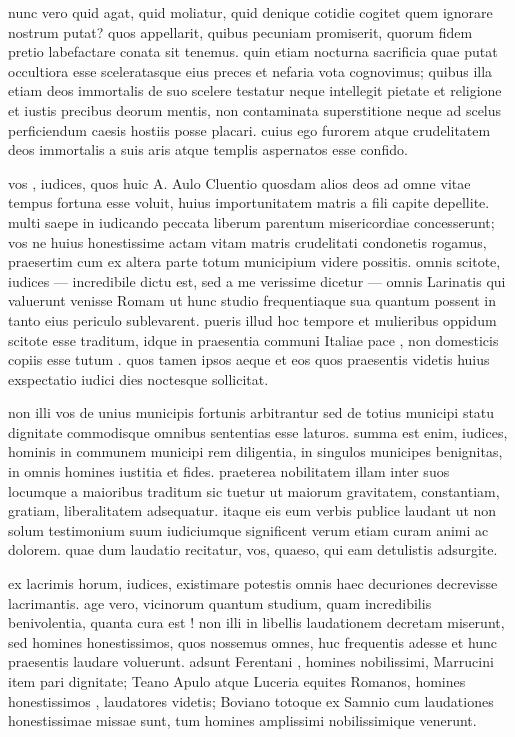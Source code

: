  nunc vero quid agat, quid moliatur, quid denique cotidie cogitet quem ignorare nostrum putat? quos appellarit, quibus pecuniam promiserit, quorum fidem pretio labefactare conata sit tenemus. quin etiam nocturna sacrificia quae putat occultiora esse sceleratasque eius preces et nefaria vota cognovimus; quibus illa etiam deos immortalis de suo scelere testatur neque intellegit pietate et religione et iustis precibus deorum mentis, non contaminata superstitione neque ad scelus perficiendum caesis hostiis posse placari. cuius ego furorem atque crudelitatem deos immortalis a suis aris atque templis aspernatos esse confido.

 vos , iudices, quos huic A. Aulo Cluentio quosdam alios deos ad omne vitae tempus fortuna esse voluit, huius importunitatem matris a fili capite depellite. multi saepe in iudicando peccata liberum parentum misericordiae concesserunt; vos ne huius honestissime actam vitam matris crudelitati condonetis rogamus, praesertim cum ex altera parte totum municipium videre possitis. omnis scitote, iudices — incredibile dictu est, sed a me verissime dicetur — omnis Larinatis qui valuerunt venisse Romam ut hunc studio frequentiaque sua quantum possent in tanto eius periculo sublevarent. pueris illud hoc tempore et mulieribus oppidum scitote esse traditum, idque in praesentia communi Italiae pace , non domesticis copiis esse tutum . quos tamen ipsos aeque et eos quos praesentis videtis huius exspectatio iudici dies noctesque sollicitat.

 non illi vos de unius municipis fortunis arbitrantur sed de totius municipi statu dignitate commodisque omnibus sententias esse laturos. summa est enim, iudices, hominis in communem municipi rem diligentia, in singulos municipes benignitas, in omnis homines iustitia et fides. praeterea nobilitatem illam inter suos locumque a maioribus traditum sic tuetur ut maiorum gravitatem, constantiam, gratiam, liberalitatem adsequatur. itaque eis eum verbis publice laudant ut non solum testimonium suum iudiciumque significent verum etiam curam animi ac dolorem. quae dum laudatio recitatur, vos, quaeso, qui eam detulistis adsurgite.

 ex lacrimis horum, iudices, existimare potestis omnis haec decuriones decrevisse lacrimantis. age vero, vicinorum quantum studium, quam incredibilis benivolentia, quanta cura est ! non illi in libellis laudationem decretam miserunt, sed homines honestissimos, quos nossemus omnes, huc frequentis adesse et hunc praesentis laudare voluerunt. adsunt Ferentani , homines nobilissimi, Marrucini item pari dignitate; Teano Apulo atque Luceria equites Romanos, homines honestissimos , laudatores videtis; Boviano totoque ex Samnio cum laudationes honestissimae missae sunt, tum homines amplissimi nobilissimique venerunt.

